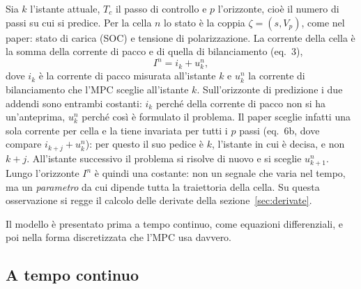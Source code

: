 \documentclass[11pt,a4paper]{article}
\newcommand{\Tc}{T_c}
\begin{document}
Sia $k$ l'istante attuale, $\Tc$ il passo di controllo e $p$ l'orizzonte, cioè
il numero di passi su cui si predice. Per la cella $n$ lo stato è la coppia
$\zeta = (s, V_p)$, come nel paper: stato di carica (SOC) e tensione di
polarizzazione. La corrente
della cella è la somma della corrente di pacco e di quella di bilanciamento
(eq.~3),
\begin{equation}
  I^n = i_k + u^n_k ,
\end{equation}
dove $i_k$ è la corrente di pacco misurata all'istante $k$ e $u^n_k$ la
corrente di bilanciamento che l'MPC sceglie all'istante $k$. Sull'orizzonte di
predizione i due addendi sono entrambi costanti: $i_k$ perché della corrente
di pacco non si ha un'anteprima, $u^n_k$ perché così è formulato il problema.
Il paper sceglie infatti una sola corrente per cella e la tiene invariata per
tutti i $p$ passi (eq.~6b, dove compare $i_{k+j} + u^n_k$): per questo il suo
pedice è $k$, l'istante in cui è decisa, e non $k+j$. All'istante successivo
il problema si risolve di nuovo e si sceglie $u^n_{k+1}$.
Lungo l'orizzonte $I^n$ è quindi una costante: non un segnale che varia nel
tempo, ma un \emph{parametro} da cui dipende tutta la traiettoria della cella.
Su questa osservazione si regge il calcolo delle derivate della
sezione~\ref{sec:derivate}.

Il modello è presentato prima a tempo continuo, come equazioni differenziali, e
poi nella forma discretizzata che l'MPC usa davvero.

\subsection{A tempo continuo}\label{sec:continuo}
\end{document}
